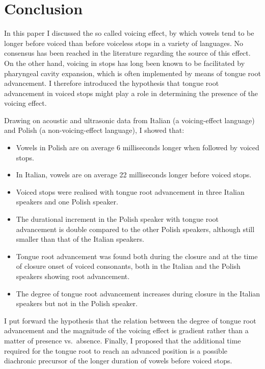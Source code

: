 \documentclass[authoryear, twocolumn]{elsarticle}
\providecommand{\tightlist}{%
  \setlength{\itemsep}{0pt}\setlength{\parskip}{0pt}}
\begin{document}
\section{Conclusion}\label{conclusion}

\label{s:conclusion}

In this paper I discussed the so called voicing effect, by which vowels
tend to be longer before voiced than before voiceless stops in a variety
of languages. No consensus has been reached in the literature regarding
the source of this effect. On the other hand, voicing in stops has long
been known to be facilitated by pharyngeal cavity expansion, which is
often implemented by means of tongue root advancement. I therefore
introduced the hypothesis that tongue root advancement in voiced stops
might play a role in determining the presence of the voicing effect.

Drawing on acoustic and ultrasonic data from Italian (a voicing-effect
language) and Polish (a non-voicing-effect language), I showed that:

\begin{itemize}
\tightlist
\item
  Vowels in Polish are on average 6 milliseconds longer when followed by
  voiced stops.
\item
  In Italian, vowels are on average 22 milliseconds longer before voiced
  stops.
\item
  Voiced stops were realised with tongue root advancement in three
  Italian speakers and one Polish speaker.
\item
  The durational increment in the Polish speaker with tongue root
  advancement is double compared to the other Polish speakers, although
  still smaller than that of the Italian speakers.
\item
  Tongue root advancement was found both during the closure and at the
  time of closure onset of voiced consonants, both in the Italian and
  the Polish speakers showing root advancement.
\item
  The degree of tongue root advancement increases during closure in the
  Italian speakers but not in the Polish speaker.
\end{itemize}

I put forward the hypothesis that the relation between the degree of
tongue root advancement and the magnitude of the voicing effect is
gradient rather than a matter of presence vs.~absence. Finally, I
proposed that the additional time required for the tongue root to reach
an advanced position is a possible diachronic precursor of the longer
duration of vowels before voiced stops.


\end{document}
